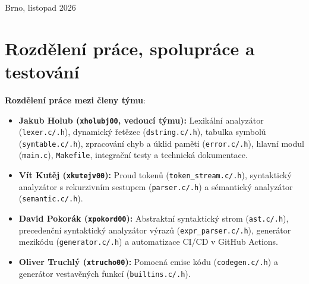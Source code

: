 \documentclass[11pt, a4paper]{article}
\begin{document}
\begin{titlepage}
  \vfill
  {\normalsize Brno, listopad 2026 \par}
\end{titlepage}

\setcounter{tocdepth}{2}
\tableofcontents
\newpage

\section{Rozdělení práce, spolupráce a testování}

\textbf{Rozdělení práce mezi členy týmu}:
\begin{itemize}
  \item \textbf{Jakub Holub (\texttt{xholubj00}, vedoucí týmu):} Lexikální analyzátor (\texttt{lexer.c/.h}), dynamický řetězec (\texttt{dstring.c/.h}), tabulka symbolů (\texttt{symtable.c/.h}), zpracování chyb a úklid paměti (\texttt{error.c/.h}), hlavní modul (\texttt{main.c}), \texttt{Makefile}, integrační testy a technická dokumentace.
  \item \textbf{Vít Kutěj (\texttt{xkutejv00}):} Proud tokenů (\texttt{token\_stream.c/.h}), syntaktický analyzátor s rekurzivním sestupem (\texttt{parser.c/.h}) a sémantický analyzátor (\texttt{semantic.c/.h}).
 \item \textbf{David Pokorák (\texttt{xpokord00}):} Abstraktní syntaktický strom (\texttt{ast.c/.h}), precedenční syntaktický analyzátor výrazů (\texttt{expr\_parser.c/.h}), generátor mezikódu (\texttt{generator.c/.h}) a automatizace CI/CD v GitHub Actions.
  \item \textbf{Oliver Truchlý (\texttt{xtrucho00}):} Pomocná emise kódu (\texttt{codegen.c/.h}) a generátor vestavěných funkcí (\texttt{builtins.c/.h}).
\end{itemize}
\end{document}
